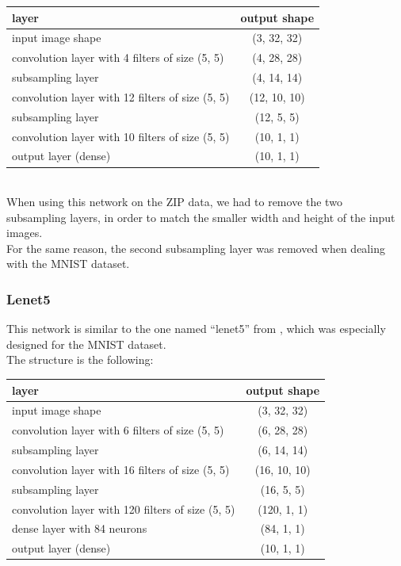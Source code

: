 \begin{tabular}{|l|c|}
 \hline
 layer & output shape\\ \hline
 input image shape & (3, 32, 32)\\
 convolution layer with 4 filters of size (5, 5) & (4, 28, 28)\\
 subsampling layer & (4, 14, 14)\\
 convolution layer with 12 filters of size (5, 5) & (12, 10, 10)\\
 subsampling layer & (12, 5, 5)\\
 convolution layer with 10 filters of size (5, 5) & (10, 1, 1)\\
 output layer (dense) & (10, 1, 1)\\ \hline
\end{tabular}\\

When using this network on the ZIP data, we had to remove the
two subsampling layers, in order to match the smaller width
and height of the input images.\\
For the same reason, the second subsampling layer was removed when
dealing with the MNIST dataset.

\subsubsection{Lenet5}

This network is similar to the one named ``lenet5'' from \cite{lecun98},
which was especially designed for the MNIST dataset.\\

The structure is the following:\\

\begin{tabular}{|l|c|}
 \hline
 layer & output shape\\ \hline
 input image shape & (3, 32, 32)\\
 convolution layer with 6 filters of size (5, 5) & (6, 28, 28)\\
 subsampling layer & (6, 14, 14)\\
 convolution layer with 16 filters of size (5, 5) & (16, 10, 10)\\
 subsampling layer & (16, 5, 5)\\
 convolution layer with 120 filters of size (5, 5) & (120, 1, 1)\\
 dense layer with 84 neurons & (84, 1, 1)\\
 output layer (dense) & (10, 1, 1)\\ \hline
\end{tabular}\\

